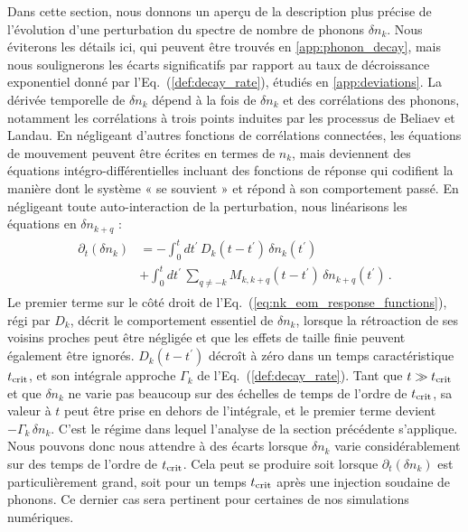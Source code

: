 \documentclass[aps,prd,notitlepage,amsfonts,amssymb,amsmath,nofootinbib,superscriptaddress,longbibliography]{revtex4-2}
\newcommand{\resumefr}[1]{\textcolor{resumecolor}{#1}}
\begin{document}
\resumefr{
Dans cette section, nous donnons un aperçu de la description plus précise de l'évolution d'une perturbation du spectre de nombre de phonons $\delta n_k$. Nous éviterons les détails ici, qui peuvent être trouvés en \ref{app:phonon_decay}, mais nous soulignerons les écarts significatifs par rapport au taux de décroissance exponentiel donné par l'Eq.~(\ref{def:decay_rate}), étudiés en \ref{app:deviations}.
La dérivée temporelle de $\delta n_{k}$ dépend à la fois de $\delta n_{k}$ et des corrélations des phonons, notamment les corrélations à trois points induites par les processus de Beliaev et Landau. En négligeant d'autres fonctions de corrélations connectées, les équations de mouvement peuvent être écrites en termes de $n_{k}$, mais deviennent des équations intégro-différentielles incluant des fonctions de réponse qui codifient la manière dont le système « se souvient » et répond à son comportement passé. En négligeant toute auto-interaction de la perturbation, nous linéarisons les équations en $\delta n_{k+q}$ :
\begin{align}
\begin{split}
\partial_{t}\left(\delta n_{k}\right) & = - \int_{0}^{t} dt^{\prime} \, D_{k}\left(t-t^{\prime}\right) \, \delta n_{k}\left(t^{\prime}\right) \\
& + \int_{0}^{t} dt^{\prime} \, \sum_{q \neq - k } M_{k,k+q}\left(t-t^{\prime}\right) \, \delta n_{k+q}\left(t^{\prime}\right) \,.
\end{split}
\end{align}
Le premier terme sur le côté droit de l'Eq.~(\ref{eq:nk_eom_response_functions}), régi par $D_k$, décrit le comportement essentiel de $\delta n_{k}$, lorsque la rétroaction de ses voisins proches peut être négligée et que les effets de taille finie peuvent également être ignorés. $D_{k}\left(t-t^{\prime}\right)$ décroît à zéro dans un temps caractéristique $t_{\rm crit}$, et son intégrale approche $\Gamma_{k}$ de l'Eq.~(\ref{def:decay_rate}). Tant que $t \gg t_{\rm crit}$ et que $\delta n_{k}$ ne varie pas beaucoup sur des échelles de temps de l'ordre de $t_{\rm crit}$, sa valeur à $t$ peut être prise en dehors de l'intégrale, et le premier terme devient $-\Gamma_{k} \, \delta n_{k}$. C'est le régime dans lequel l'analyse de la section précédente s'applique. Nous pouvons donc nous attendre à des écarts lorsque $\delta n_{k}$ varie considérablement sur des temps de l'ordre de $t_{\rm crit}$. Cela peut se produire soit lorsque $\partial_{t}\left(\delta n_{k}\right)$ est particulièrement grand, soit pour un temps $t_{\rm crit}$ après une injection soudaine de phonons. Ce dernier cas sera pertinent pour certaines de nos simulations numériques.
}
\end{document}
